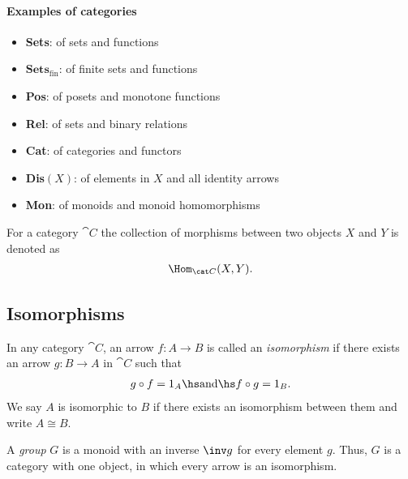 \documentclass{article}
\begin{document}
\paragraph{Examples of categories}
\begin{itemize}
    \item \textbf{Sets}: of sets and functions
    \item $\textbf{Sets}_\text{fin}$: of finite sets and functions
    \item \textbf{Pos}: of posets and monotone functions
    \item \textbf{Rel}: of sets and binary relations
    \item \textbf{Cat}: of categories and functors
    \item \textbf{Dis$(X)$}: of elements in $X$ and all identity arrows
    \item \textbf{Mon}: of monoids and monoid homomorphisms
\end{itemize}

\begin{definition}
    For a category $\cat C$ the collection of morphisms between two objects
    $X$ and $Y$ is denoted as
    \begin{align*}
        \Hom_{\cat C}(X,Y).
    \end{align*}
\end{definition}

\subsection{Isomorphisms}

\begin{definition}
    In any category $\cat{C}$, an arrow $f:A\to B$ is called an
    \emph{isomorphism} if there exists an arrow $g:B\to A$ in
    $\cat{C}$ such that 
    \begin{align*}
        g\circ f = 1_A\hs\text{and}\hs f\circ g = 1_B.
    \end{align*}
    We say $A$ is isomorphic to $B$ if there exists an isomorphism
    between them and write $A\cong B$.
\end{definition}

\begin{definition}
    A \emph{group} $G$ is a monoid with an inverse $\inv g$ for every element $g$.
    Thus, $G$ is a category with one object, in which every arrow is an isomorphism.
\end{definition}
\end{document}
